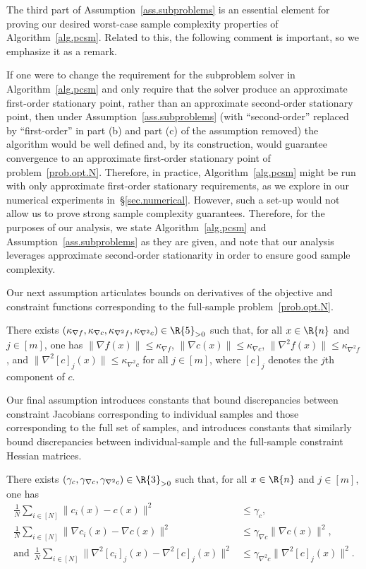 The third part of Assumption~\ref{ass.subproblems} is an essential element for proving our desired worst-case sample complexity properties of Algorithm~\ref{alg.pcsm}.  Related to this, the following comment is important, so we emphasize it as a remark.

\bremark
  If one were to change the requirement for the subproblem solver in Algorithm~\ref{alg.pcsm} and only require that the solver produce an approximate first-order stationary point, rather than an approximate second-order stationary point, then under Assumption~\ref{ass.subproblems} (with ``second-order'' replaced by ``first-order'' in part (b) and part (c) of the assumption removed) the algorithm would be well defined and, by its construction, would guarantee convergence to an approximate first-order stationary point of problem~\eqref{prob.opt.N}.  Therefore, in practice, Algorithm~\ref{alg.pcsm} might be run with only approximate first-order stationary requirements, as we explore in our numerical experiments in~\S\ref{sec.numerical}.  However, such a set-up would not allow us to prove strong sample complexity guarantees.  Therefore, for the purposes of our analysis, we state Algorithm~\ref{alg.pcsm} and Assumption~\ref{ass.subproblems} as they are given, and note that our analysis leverages approximate second-order stationarity in order to ensure good sample complexity.
\eremark

Our next assumption articulates bounds on derivatives of the objective and constraint functions corresponding to the full-sample problem~\eqref{prob.opt.N}.

\bassumption\label{ass.boundness}
  There exists $(\kappa_{\nabla f}, \kappa_{\nabla c}, \kappa_{\nabla^2 f}, \kappa_{\nabla^2 c}) \in \R{5}_{>0}$ such that, for all $x \in \R{n}$ and $j \in [m]$, one has $\| \nabla f(x) \| \leq \kappa_{\nabla f}$, $\| \nabla c(x) \| \leq \kappa_{\nabla c}$, $\| \nabla^2 f(x) \| \leq \kappa_{\nabla^2 f}$, and $\| \nabla^2 [c]_j (x) \| \leq \kappa_{\nabla^2 c}$ for all $j \in [m]$, where $[c]_j$ denotes the $j$th component of $c$.
\eassumption

Our final assumption introduces constants that bound discrepancies between constraint Jacobians corresponding to individual samples and those corresponding to the full set of samples, and introduces constants that similarly bound discrepancies between individual-sample and the full-sample constraint Hessian matrices.

\bassumption\label{ass.bounded.distribute}
  There exists $(\gamma_c, \gamma_{\nabla c}, \gamma_{\nabla^2 c}) \in \R{3}_{>0}$ such that, for all $x \in \R{n}$ and $j \in [m]$, one has
  \begin{align*}
    \frac{1}{N} \sum_{i \in [N]} \| c_i(x) -  c(x) \|^2 &\leq \gamma_c, \\
    \frac{1}{N} \sum_{i \in [N]} \| \nabla c_i(x)-\nabla c(x) \|^2 &\leq \gamma_{\nabla c} \|\nabla c (x) \|^2, \\ \text{and}\ \ 
    \frac{1}{N} \sum_{i \in [N]} \| \nabla^2 [c_i]_j(x) - \nabla^2 [c]_j(x) \|^2 &\leq \gamma_{\nabla^2 c} \| \nabla^2 [c]_j(x) \|^2.
  \end{align*}
\eassumption

